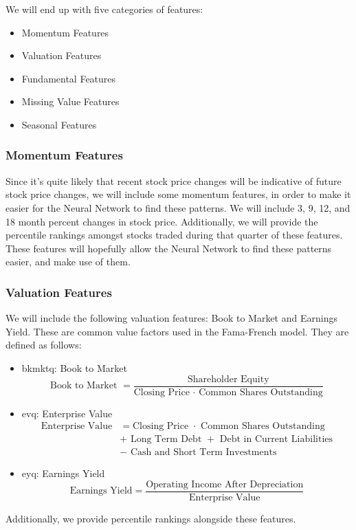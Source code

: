\documentclass[AER]{AEA}
\begin{document}
We will end up with five categories of features: 
\begin{itemize}
    \item Momentum Features
    \item Valuation Features
    \item Fundamental Features
    \item Missing Value Features
    \item Seasonal Features
\end{itemize}
\subsubsection{Momentum Features}
Since it's quite likely that recent stock price changes will be indicative of future stock price changes,
we will include some momentum features, in order to make it easier for the Neural Network to find these patterns.
We will include 3, 9, 12, and 18 month percent changes in stock price.
Additionally, we will provide the percentile rankings amongst stocks traded during that quarter of these features.
These features will hopefully allow the Neural Network to find these patterns easier, and make use of them.
\subsubsection{Valuation Features}
We will include the following valuation features: Book to Market and Earnings Yield.
These are common value factors used in the Fama-French model.
They are defined as follows:
\begin{itemize}
    \item 
        bkmktq: Book to Market
        $$\text{Book to Market } = \frac{\text{Shareholder Equity}}{\text{Closing Price } \cdot \text{ Common Shares Outstanding}} $$
    \item
        evq: Enterprise Value
        \begin{align*}
        \text{Enterprise Value} &= \text{Closing Price } \cdot \text{ Common Shares Outstanding}\\
        &+ \text{ Long Term Debt } + \text{ Debt in Current Liabilities}\\
        &- \text{ Cash and Short Term Investments}
        \end{align*}
    \item
        eyq: Earnings Yield
        $$
        \text{Earnings Yield} = \frac{\text{Operating Income After Depreciation}}{\text{Enterprise Value}}
        $$
\end{itemize}
Additionally, we provide percentile rankings alongside these features.
\end{document}
